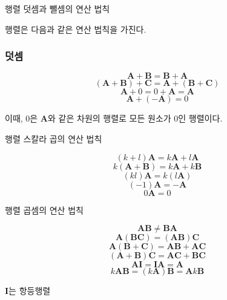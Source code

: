 \documentclass{beamer}
\begin{document}
\begin{frame}{행렬 덧셈과 뺄셈의 연산 법칙}

행렬은 다음과 같은 연산 법칙을 가진다.

\subsubsection{덧셈}

$$\mathbf A + \mathbf B = \mathbf B + \mathbf A$$
$$(\mathbf A + \mathbf B ) + \mathbf C = \mathbf A + ( \mathbf B + \mathbf C ) $$
$$ \mathbf A + 0 = 0 + \mathbf A = \mathbf A$$
$$ \mathbf A + (- \mathbf A ) = 0$$

이때, 0은 $\mathbf A$와 같은 차원의 행렬로 모든 원소가 0인 행렬이다.

\end{frame}


\begin{frame}{행렬 스칼라 곱의 연산 법칙}

$$(k+l) \mathbf A = k \mathbf A + l \mathbf A$$
$$k (\mathbf A + \mathbf B ) = k \mathbf A + k \mathbf B$$
$$(kl) \mathbf A = k (l \mathbf A)$$
$$ (-1) \mathbf A = -\mathbf A$$
$$ 0 \mathbf A = 0$$


\end{frame}

\begin{frame}{행렬 곱셈의 연산 법칙}

$$\mathbf{AB} \neq \mathbf {BA}$$
$$\mathbf{A(BC)} = \mathbf{(AB)C}$$
$$\mathbf{A(B+C)} = \mathbf {AB} + \mathbf {AC}$$
$$\mathbf{(A+B)C} = \mathbf{AC} + \mathbf{BC}$$
$$\mathbf{AI} = \mathbf{IA} = \mathbf A$$
$$k \mathbf{AB} = (k\mathbf A)\mathbf B = \mathbf A k \mathbf B$$

$\mathbf I$는 항등행렬

\end{frame}
\end{document}

